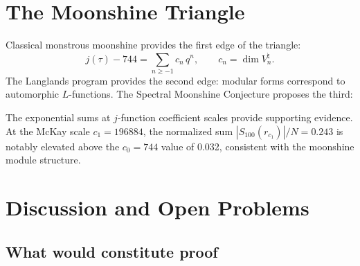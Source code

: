 \documentclass[11pt]{amsart}
\theoremstyle{definition}
\begin{document}
\section{The Moonshine Triangle}
\label{sec:triangle}

Classical monstrous moonshine provides the first edge of the triangle:
\[
j(\tau) - 744 = \sum_{n \geq -1} c_n\, q^n, \qquad c_n = \dim V_n^\natural.
\]
The Langlands program provides the second edge: modular forms correspond to automorphic $L$-functions. The Spectral Moonshine Conjecture proposes the third:
\begin{center}
\end{center}

The exponential sums at $j$-function coefficient scales provide supporting evidence. At the McKay scale $c_1 = 196884$, the normalized sum $|S_{100}(r_{c_1})|/N = 0.243$ is notably elevated above the $c_0 = 744$ value of 0.032, consistent with the moonshine module structure.


\section{Discussion and Open Problems}
\label{sec:discussion}

\subsection{What would constitute proof}
\end{document}

